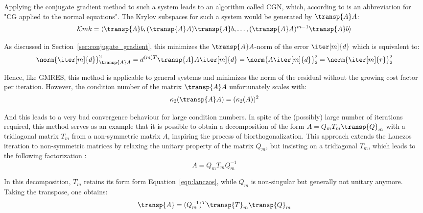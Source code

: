 \noindent Applying the conjugate gradient method to such a system leads to an algorithm called CGN, which, according to \cite{trefethen_numerical_1997} is an abbreviation for "CG applied to the normal equations". The Krylov subspaces for such a system would be generated by $\transp{A}A$:
\begin{equation}
    \mathcal{K}mk = \langle \transp{A}b, (\transp{A}A)\transp{A}b, \dots, (\transp{A}A)^{m-1}\transp{A}b\rangle
\end{equation}

\noindent As discussed in Section~\hyperref[sec:conjugate_gradient]{\ref{sec:conjugate_gradient}}, this minimizes the $\transp{A}A$-norm of the error $\iter[m]{d}$ which is equivalent to:
\begin{equation}
    \norm{\iter[m]{d}}_{\transp{A}A}^2 = d^{(m)T}\transp{A}A\iter[m]{d}=\norm{
    A\iter[m]{d}}_2^2 = \norm{\iter[m]{r}}_2^2
\end{equation}

\noindent Hence, like GMRES, this method is applicable to general systems and minimizes the norm of the residual without the growing cost factor per iteration. However, the condition number of the matrix $\transp{A}A$ unfortunately scales with:
\begin{equation}
    \kappa_2(\transp{A}A) = (\kappa_2(A))^2
\end{equation}

\noindent And this leads to a very bad convergence behaviour for large condition numbers. In spite of the (possibly) large number of iterations required, this method serves as an example that it is possible to obtain a decomposition of the form $A=Q_mT_m \transp{Q}_m$  with a tridiagonal matrix $T_m$ from a non-symmetric matrix $A$, inspiring the process of biorthogonalization. 
This approach extends the Lanczos iteration to non-symmetric matrices by relaxing the unitary property of the matrix $Q_m$, but insisting on a tridiagonal $T_m$, which leads to the following factorization \cite{golub_matrix_2013}:
\begin{equation}
    A=Q_mT_mQ_m^{-1}
\end{equation}

\noindent In this decomposition, $T_m$ retains its form form Equation~\hyperref[eqn:lanczos]{\ref{eqn:lanczos}}, while $Q_m$ is non-singular but generally not unitary anymore. Taking the transpose, one obtains:
\begin{equation}
    \transp{A} = (Q_m^{-1})^T\transp{T}_m\transp{Q}_m
\end{equation}

